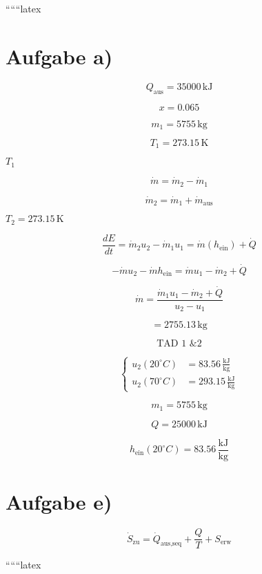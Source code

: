 ``````latex


\section*{Aufgabe a)}

\[
Q_{\text{aus}} = 35000 \, \text{kJ}
\]

\[
x = 0.065
\]

\[
m_1 = 5755 \, \text{kg}
\]

\[
T_1 = 273.15 \, \text{K}
\]

 \( T_1 \)

\[
\dot{m} = \dot{m}_2 - \dot{m}_1
\]

\[
\dot{m}_2 = \dot{m}_1 + \dot{m}_\text{aus}
\]

 \( T_2 = 273.15 \, \text{K} \)

\[
\frac{dE}{dt} = \dot{m}_2 u_2 - \dot{m}_1 u_1 = \dot{m} (h_\text{ein}) + \dot{Q}
\]

\[
-\dot{m} u_2 - \dot{m} h_\text{ein} = \dot{m} u_1 - \dot{m}_2 + \dot{Q}
\]

\[
\dot{m} = \frac{\dot{m}_1 u_1 - \dot{m}_2 + \dot{Q}}{u_2 - u_1}
\]

\[
= 2755.13 \, \text{kg}
\]


\[
\text{TAD 1 \& 2}
\]

\[
\left\{
\begin{aligned}
u_2 (20^\circ C) &= 83.56 \, \frac{\text{kJ}}{\text{kg}} \\
u_2 (70^\circ C) &= 293.15 \, \frac{\text{kJ}}{\text{kg}}
\end{aligned}
\right.
\]

\[
m_1 = 5755 \, \text{kg}
\]

\[
Q = 25000 \, \text{kJ}
\]

\[
h_\text{ein} (20^\circ C) = 83.56 \, \frac{\text{kJ}}{\text{kg}}
\]

\section*{Aufgabe e)}


\[
\dot{S}_{\text{zu}} = \dot{Q}_{\text{aus,seq}} + \frac{Q}{T} + S_{\text{erw}}
\]

``````latex



